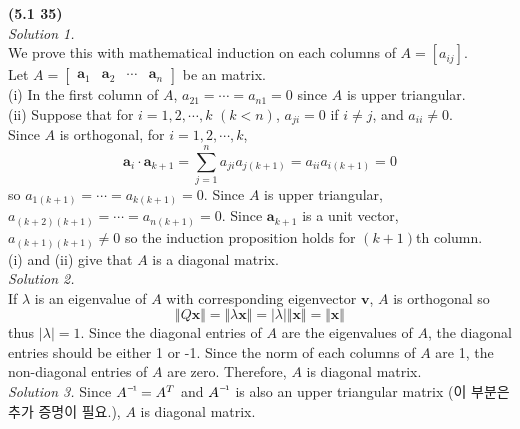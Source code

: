 \textbf{(5.1 35)} \\
\textit{Solution 1.} \\
We prove this with mathematical induction on each columns of $A = [a_{ij}]$. \\

Let $A = \begin{bmatrix}
	\textbf{a}_1 & \textbf{a}_2  & \cdots & \textbf{a}_n
\end{bmatrix}$ be an \nbyn matrix. \\

(i) In the first column of $A$, $a_{21} = \cdots = a_{n1} = 0$ since $A$ is upper triangular. \\

(ii) Suppose that for $i = 1, 2, \cdots, k$ $(k < n)$, $a_{ji} = 0$ if $i \neq j$, and $a_{ii} \neq 0$. \\

 Since $A$ is orthogonal, for $i = 1, 2, \cdots, k$, \begin{equation*}
	\textbf{a}_i \cdot \textbf{a}_{k+1} = \sum_{j=1}^{n}a_{ji}a_{j(k+1)} = a_{ii}a_{i(k+1)} = 0
\end{equation*} so $a_{1(k+1)} = \cdots = a_{k(k+1)} = 0$. Since $A$ is upper triangular, $a_{(k+2)(k+1)} = \cdots = a_{n(k+1)} = 0$. Since $\textbf{a}_{k+1}$ is a unit vector, $a_{(k+1)(k+1)} \neq 0$ so the induction proposition holds for $(k+1)$th column. \\

(i) and (ii) give that $A$ is a diagonal matrix. \\

\textit{Solution 2.} \\
If $\lambda$ is an eigenvalue of $A$ with corresponding eigenvector $\textbf{v}$, $A$ is orthogonal so \begin{equation*}
	\Vert Q\textbf{x} \Vert = \Vert \lambda \textbf{x} \Vert = \vert \lambda \vert \Vert \textbf{x} \Vert = \Vert \textbf{x} \Vert
\end{equation*} thus $\vert \lambda \vert = 1$. Since the diagonal entries of $A$ are the eigenvalues of $A$, the diagonal entries should be either 1 or -1. Since the norm of each columns of $A$ are 1, the non-diagonal entries of $A$ are zero. Therefore, $A$ is diagonal matrix. \\

\textit{Solution 3.} Since $\inv{A} = A^T$ and $\inv{A}$ is also an upper triangular matrix (이 부분은 추가 증명이 필요.), $A$ is diagonal matrix. \\

